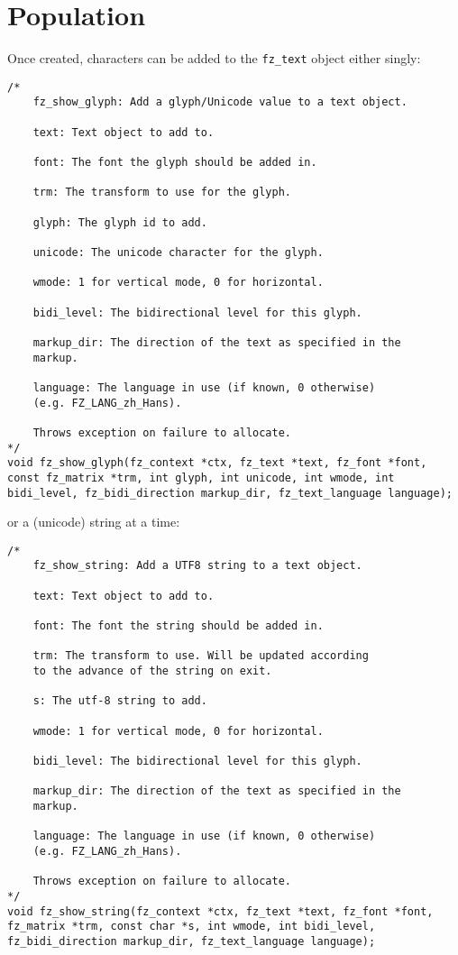 \documentclass[oneside]{book}
\begin{document}
\section{Population}
\label{TextPopulation}

Once created, characters can be added to the \texttt{fz\_text} object either singly:

\begin{lstlisting}
/*
	fz_show_glyph: Add a glyph/Unicode value to a text object.

	text: Text object to add to.

	font: The font the glyph should be added in.

	trm: The transform to use for the glyph.

	glyph: The glyph id to add.

	unicode: The unicode character for the glyph.

	wmode: 1 for vertical mode, 0 for horizontal.

	bidi_level: The bidirectional level for this glyph.

	markup_dir: The direction of the text as specified in the
	markup.

	language: The language in use (if known, 0 otherwise)
	(e.g. FZ_LANG_zh_Hans).

	Throws exception on failure to allocate.
*/
void fz_show_glyph(fz_context *ctx, fz_text *text, fz_font *font, const fz_matrix *trm, int glyph, int unicode, int wmode, int bidi_level, fz_bidi_direction markup_dir, fz_text_language language);
\end{lstlisting}

or a (unicode) string at a time:

\begin{lstlisting}
/*
	fz_show_string: Add a UTF8 string to a text object.

	text: Text object to add to.

	font: The font the string should be added in.

	trm: The transform to use. Will be updated according
	to the advance of the string on exit.

	s: The utf-8 string to add.

	wmode: 1 for vertical mode, 0 for horizontal.

	bidi_level: The bidirectional level for this glyph.

	markup_dir: The direction of the text as specified in the
	markup.

	language: The language in use (if known, 0 otherwise)
	(e.g. FZ_LANG_zh_Hans).

	Throws exception on failure to allocate.
*/
void fz_show_string(fz_context *ctx, fz_text *text, fz_font *font, fz_matrix *trm, const char *s, int wmode, int bidi_level, fz_bidi_direction markup_dir, fz_text_language language);
\end{lstlisting}
\end{document}

